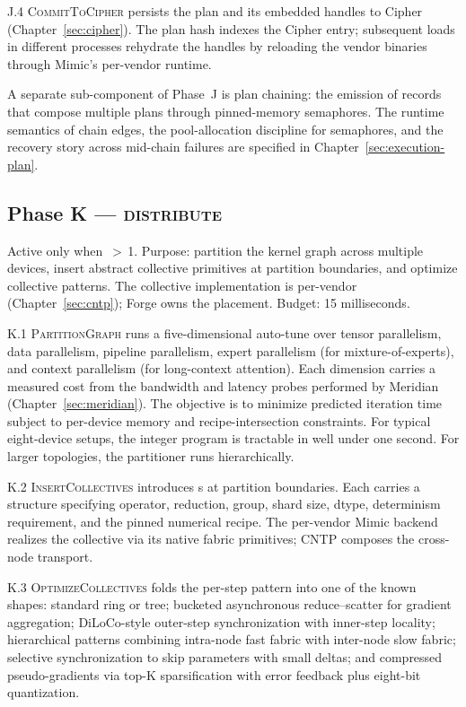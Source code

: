 J.4 \textsc{CommitToCipher} persists the plan and its embedded  handles to Cipher (Chapter~\ref{sec:cipher}).
The plan hash indexes the Cipher entry; subsequent loads in different processes rehydrate the  handles by reloading the vendor binaries through Mimic's per-vendor runtime.

A separate sub-component of Phase~J is plan chaining: the emission of  records that compose multiple plans through pinned-memory semaphores.
The runtime semantics of chain edges, the pool-allocation discipline for semaphores, and the recovery story across mid-chain failures are specified in Chapter~\ref{sec:execution-plan}.

\subsection{Phase K --- \textsc{distribute}}
\label{sec:forge-phase-k}

Active only when \,$>$\,1.
Purpose: partition the  kernel graph across multiple devices, insert abstract collective primitives at partition boundaries, and optimize collective patterns.
The collective implementation is per-vendor (Chapter~\ref{sec:cntp}); Forge owns the placement.
Budget: 15 milliseconds.

K.1 \textsc{PartitionGraph} runs a five-dimensional auto-tune over tensor parallelism, data parallelism, pipeline parallelism, expert parallelism (for mixture-of-experts), and context parallelism (for long-context attention).
Each dimension carries a measured cost from the bandwidth and latency probes performed by Meridian (Chapter~\ref{sec:meridian}).
The objective is to minimize predicted iteration time subject to per-device memory and recipe-intersection constraints.
For typical eight-device setups, the integer program is tractable in well under one second.
For larger topologies, the partitioner runs hierarchically.

K.2 \textsc{InsertCollectives} introduces  s at partition boundaries.
Each carries a  structure specifying operator, reduction, group, shard size, dtype, determinism requirement, and the pinned numerical recipe.
The per-vendor Mimic backend realizes the collective via its native fabric primitives; CNTP composes the cross-node transport.

K.3 \textsc{OptimizeCollectives} folds the per-step pattern into one of the known shapes: standard ring or tree; bucketed asynchronous reduce--scatter for gradient aggregation; DiLoCo-style outer-step synchronization with inner-step locality; hierarchical patterns combining intra-node fast fabric with inter-node slow fabric; selective synchronization to skip parameters with small deltas; and compressed pseudo-gradients via top-K sparsification with error feedback plus eight-bit quantization.


